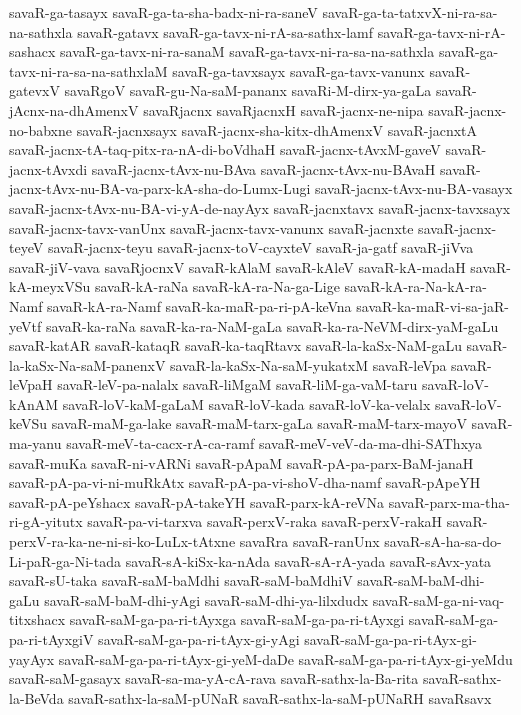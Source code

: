 {savaR-ga-tasayx
savaR-ga-ta-sha-badx-ni-ra-saneV
savaR-ga-ta-tatxvX-ni-ra-sa-na-sathxla
savaR-gatavx
savaR-ga-tavx-ni-rA-sa-sathx-lamf
savaR-ga-tavx-ni-rA-sashacx
savaR-ga-tavx-ni-ra-sanaM
savaR-ga-tavx-ni-ra-sa-na-sathxla
savaR-ga-tavx-ni-ra-sa-na-sathxlaM
savaR-ga-tavxsayx
savaR-ga-tavx-vanunx
savaR-gatevxV
savaRgoV
savaR-gu-Na-saM-pananx
savaRi-M-dirx-ya-gaLa
savaR-jAcnx-na-dhAmenxV
savaRjacnx
savaRjacnxH
savaR-jacnx-ne-nipa
savaR-jacnx-no-babxne
savaR-jacnxsayx
savaR-jacnx-sha-kitx-dhAmenxV
savaR-jacnxtA
savaR-jacnx-tA-taq-pitx-ra-nA-di-boVdhaH
savaR-jacnx-tAvxM-gaveV
savaR-jacnx-tAvxdi
savaR-jacnx-tAvx-nu-BAva
savaR-jacnx-tAvx-nu-BAvaH
savaR-jacnx-tAvx-nu-BA-va-parx-kA-sha-do-Lumx-Lugi
savaR-jacnx-tAvx-nu-BA-vasayx
savaR-jacnx-tAvx-nu-BA-vi-yA-de-nayAyx
savaR-jacnxtavx
savaR-jacnx-tavxsayx
savaR-jacnx-tavx-vanUnx
savaR-jacnx-tavx-vanunx
savaR-jacnxte
savaR-jacnx-teyeV
savaR-jacnx-teyu
savaR-jacnx-toV-cayxteV
savaR-ja-gatf
savaR-jiVva
savaR-jiV-vava
savaRjocnxV
savaR-kAlaM
savaR-kAleV
savaR-kA-madaH
savaR-kA-meyxVSu
savaR-kA-raNa
savaR-kA-ra-Na-ga-Lige
savaR-kA-ra-Na-kA-ra-Namf
savaR-kA-ra-Namf
savaR-ka-maR-pa-ri-pA-keVna
savaR-ka-maR-vi-sa-jaR-yeVtf
savaR-ka-raNa
savaR-ka-ra-NaM-gaLa
savaR-ka-ra-NeVM-dirx-yaM-gaLu
savaR-katAR
savaR-kataqR
savaR-ka-taqRtavx
savaR-la-kaSx-NaM-gaLu
savaR-la-kaSx-Na-saM-panenxV
savaR-la-kaSx-Na-saM-yukatxM
savaR-leVpa
savaR-leVpaH
savaR-leV-pa-nalalx
savaR-liMgaM
savaR-liM-ga-vaM-taru
savaR-loV-kAnAM
savaR-loV-kaM-gaLaM
savaR-loV-kada
savaR-loV-ka-velalx
savaR-loV-keVSu
savaR-maM-ga-lake
savaR-maM-tarx-gaLa
savaR-maM-tarx-mayoV
savaR-ma-yanu
savaR-meV-ta-cacx-rA-ca-ramf
savaR-meV-veV-da-ma-dhi-SAThxya
savaR-muKa
savaR-ni-vARNi
savaR-pApaM
savaR-pA-pa-parx-BaM-janaH
savaR-pA-pa-vi-ni-muRkAtx
savaR-pA-pa-vi-shoV-dha-namf
savaR-pApeYH
savaR-pA-peYshacx
savaR-pA-takeYH
savaR-parx-kA-reVNa
savaR-parx-ma-tha-ri-gA-yitutx
savaR-pa-vi-tarxva
savaR-perxV-raka
savaR-perxV-rakaH
savaR-perxV-ra-ka-ne-ni-si-ko-LuLx-tAtxne
savaRra
savaR-ranUnx
savaR-sA-ha-sa-do-Li-paR-ga-Ni-tada
savaR-sA-kiSx-ka-nAda
savaR-sA-rA-yada
savaR-sAvx-yata
savaR-sU-taka
savaR-saM-baMdhi
savaR-saM-baMdhiV
savaR-saM-baM-dhi-gaLu
savaR-saM-baM-dhi-yAgi
savaR-saM-dhi-ya-lilxdudx
savaR-saM-ga-ni-vaq-titxshacx
savaR-saM-ga-pa-ri-tAyxga
savaR-saM-ga-pa-ri-tAyxgi
savaR-saM-ga-pa-ri-tAyxgiV
savaR-saM-ga-pa-ri-tAyx-gi-yAgi
savaR-saM-ga-pa-ri-tAyx-gi-yayAyx
savaR-saM-ga-pa-ri-tAyx-gi-yeM-daDe
savaR-saM-ga-pa-ri-tAyx-gi-yeMdu
savaR-saM-gasayx
savaR-sa-ma-yA-cA-rava
savaR-sathx-la-Ba-rita
savaR-sathx-la-BeVda
savaR-sathx-la-saM-pUNaR
savaR-sathx-la-saM-pUNaRH
savaRsavx
}
